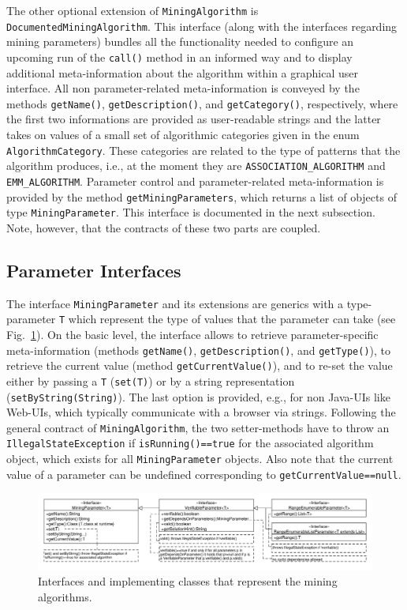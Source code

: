 \documentclass{scrartcl}
\newcommand{\class}[1]{\texttt{#1}}
\begin{document}
The other optional extension of \class{MiningAlgorithm} is
\class{DocumentedMiningAlgorithm}. This interface (along with the interfaces
regarding mining parameters) bundles all the functionality needed to configure
an upcoming run of the \class{call()} method in an informed way and to display
additional meta-information about the algorithm within a graphical user
interface. All non parameter-related meta-information is conveyed by the
methods \class{getName()}, \class{getDescription()}, and \class{getCategory()}, respectively, where the
first two informations are provided as user-readable strings and the latter
takes on values of a small set of algorithmic categories given in the enum
\class{AlgorithmCategory}. These categories are related to the type of patterns
that the algorithm produces, i.e., at the moment they are
\class{ASSOCIATION\_ALGORITHM} and \class{EMM\_ALGORITHM}.
Parameter control and parameter-related meta-information is provided by the
method \class{getMiningParameters}, which returns a list of objects of type
\class{MiningParameter}. This interface is documented in the next subsection.
Note, however, that the contracts of these two parts are coupled. 

\subsection{Parameter Interfaces}
The interface \class{MiningParameter} and its extensions are generics with a
type-parameter \class{T} which represent the type of values that the
parameter can take (see Fig.~\ref{fig:parameters_interfaces}). On the basic
level, the interface allows to retrieve parameter-specific meta-information
(methods \class{getName()}, \class{getDescription()}, and \class{getType()}),
to retrieve the current value (method \class{getCurrentValue()}), and to re-set
the value either by passing a \class{T} (\class{set(T)}) or by a string
representation (\class{setByString(String)}). The last option is provided, e.g.,
for non Java-UIs like Web-UIs, which typically communicate with a browser via
strings. Following the general contract of \class{MiningAlgorithm}, the two
setter-methods have to throw an \class{IllegalStateException} if
\class{isRunning()==true} for the associated algorithm object, which exists for
all \class{MiningParameter} objects. Also note that the current value of a
parameter can be undefined corresponding to \class{getCurrentValue==null}.
\begin{figure}[hb]
\includegraphics[width=\columnwidth]{mining/parameters_interfaces.pdf}
\caption{Interfaces and implementing classes that represent the mining
algorithms.}
\label{fig:parameters_interfaces}
\end{figure}
\end{document}
